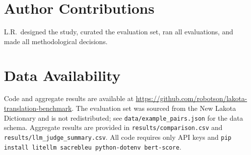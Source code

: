 \documentclass[11pt]{article}
\begin{document}
\section*{Author Contributions}

L.R.\ designed the study, curated the evaluation set, ran all evaluations, and made all methodological decisions.

\section*{Data Availability}

Code and aggregate results are available at \url{https://github.com/robotson/lakota-translation-benchmark}. The evaluation set was sourced from the New Lakota Dictionary and is not redistributed; see \texttt{data/example\_pairs.json} for the data schema. Aggregate results are provided in \texttt{results/comparison.csv} and \texttt{results/llm\_judge\_summary.csv}. All code requires only API keys and \texttt{pip install litellm sacrebleu python-dotenv bert-score}.


\end{document}

